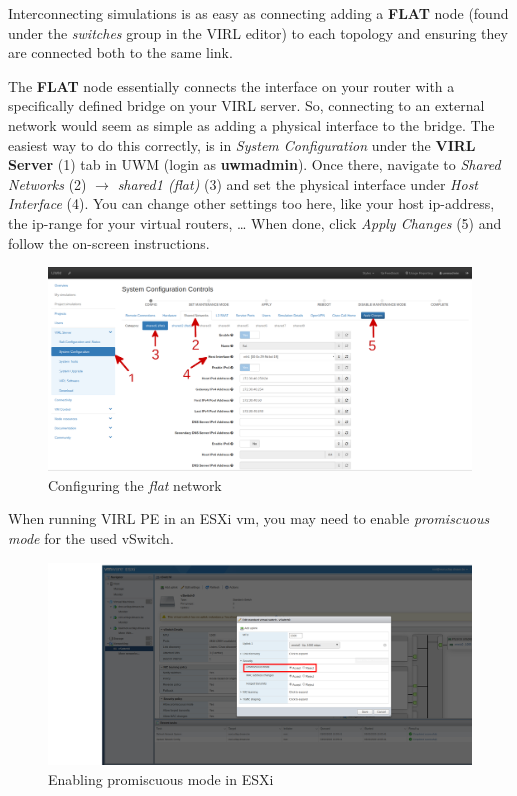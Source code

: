 \documentclass{article}
\begin{document}
Interconnecting simulations is as easy as connecting adding a \textbf{FLAT} node
(found under the \textit{switches} group in the VIRL editor)
to each topology and ensuring they are connected both to the same link.

The \textbf{FLAT} node essentially connects the interface on your router
with a specifically defined bridge on your VIRL server.
So, connecting to an external network would seem as simple as adding a physical interface to the bridge.
The easiest way to do this correctly,
is in \textit{System Configuration} under the \textbf{VIRL Server} (1) tab in UWM
(login as \textbf{uwmadmin}).
Once there, navigate to \textit{Shared Networks} (2) $\rightarrow$ \textit{shared1 (flat)} (3)
and set the physical interface under \textit{Host Interface} (4).
You can change other settings too here, like your host ip-address, the ip-range for your virtual routers, \dots
When done, click \textit{Apply Changes} (5) and follow the on-screen instructions.
\begin{figure}[H]
	\centering
	\includegraphics[width=\textwidth]{images/uwm_configure_flat.png}
	\caption{Configuring the \textit{flat} network}
\end{figure}

When running VIRL PE in an ESXi vm, you may need to enable \textit{promiscuous mode} for the used vSwitch.
\begin{figure}[H]
	\centering
	\includegraphics[width=\textwidth]{images/esxi_allow_promiscuous_mode.png}
	\caption{Enabling promiscuous mode in ESXi}
\end{figure}
\end{document}
